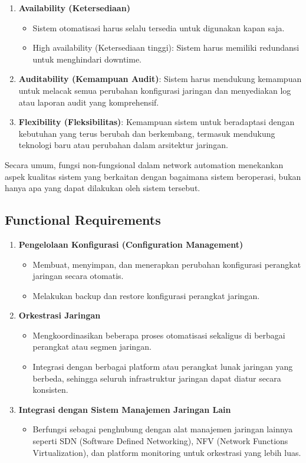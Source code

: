 \begin{enumerate}
    \item \textbf{Availability (Ketersediaan)}
    \begin{itemize}
        \item Sistem otomatisasi harus selalu tersedia untuk digunakan kapan saja.
        \item High availability (Ketersediaan tinggi): Sistem harus memiliki redundansi untuk menghindari downtime.
    \end{itemize}
    
    \item \textbf{Auditability (Kemampuan Audit)}: Sistem harus mendukung kemampuan untuk melacak semua perubahan konfigurasi jaringan dan menyediakan log atau laporan audit yang komprehensif.
    
    \item \textbf{Flexibility (Fleksibilitas)}: Kemampuan sistem untuk beradaptasi dengan kebutuhan yang terus berubah dan berkembang, termasuk mendukung teknologi baru atau perubahan dalam arsitektur jaringan.
\end{enumerate}

Secara umum, fungsi non-fungsional dalam network automation menekankan aspek kualitas sistem yang berkaitan dengan bagaimana sistem beroperasi, bukan hanya apa yang dapat dilakukan oleh sistem tersebut.

\subsection{Functional Requirements}
\begin{enumerate}
    \item \textbf{Pengelolaan Konfigurasi (Configuration Management)}
    \begin{itemize}
        \item Membuat, menyimpan, dan menerapkan perubahan konfigurasi perangkat jaringan secara otomatis.
        \item Melakukan backup dan restore konfigurasi perangkat jaringan.
    \end{itemize}
    
    \item \textbf{Orkestrasi Jaringan}
    \begin{itemize}
        \item Mengkoordinasikan beberapa proses otomatisasi sekaligus di berbagai perangkat atau segmen jaringan.
        \item Integrasi dengan berbagai platform atau perangkat lunak jaringan yang berbeda, sehingga seluruh infrastruktur jaringan dapat diatur secara konsisten.
    \end{itemize}
    
    \item \textbf{Integrasi dengan Sistem Manajemen Jaringan Lain}
    \begin{itemize}
        \item Berfungsi sebagai penghubung dengan alat manajemen jaringan lainnya seperti SDN (Software Defined Networking), NFV (Network Functions Virtualization), dan platform monitoring untuk orkestrasi yang lebih luas.
    \end{itemize}
\end{enumerate}

